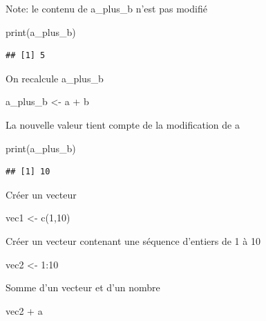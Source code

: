 \documentclass[
]{book}
\newenvironment{Shaded}{\begin{snugshade}}{\end{snugshade}}
\newcommand{\DecValTok}[1]{\textcolor[rgb]{0.00,0.00,0.81}{#1}}
\newcommand{\FunctionTok}[1]{\textcolor[rgb]{0.00,0.00,0.00}{#1}}
\newcommand{\NormalTok}[1]{#1}
\newcommand{\OtherTok}[1]{\textcolor[rgb]{0.56,0.35,0.01}{#1}}
\newcommand{\SpecialCharTok}[1]{\textcolor[rgb]{0.00,0.00,0.00}{#1}}
\begin{document}
Note: le contenu de a\_plus\_b n'est pas modifié

\begin{Shaded}
\begin{Highlighting}[]
\FunctionTok{print}\NormalTok{(a\_plus\_b) }
\end{Highlighting}
\end{Shaded}

\begin{verbatim}
## [1] 5
\end{verbatim}

On recalcule a\_plus\_b

\begin{Shaded}
\begin{Highlighting}[]
\NormalTok{a\_plus\_b }\OtherTok{\textless{}{-}}\NormalTok{ a }\SpecialCharTok{+}\NormalTok{ b }
\end{Highlighting}
\end{Shaded}

La nouvelle valeur tient compte de la modification de a

\begin{Shaded}
\begin{Highlighting}[]
\FunctionTok{print}\NormalTok{(a\_plus\_b)}
\end{Highlighting}
\end{Shaded}

\begin{verbatim}
## [1] 10
\end{verbatim}

Créer un vecteur

\begin{Shaded}
\begin{Highlighting}[]
\NormalTok{vec1 }\OtherTok{\textless{}{-}}  \FunctionTok{c}\NormalTok{(}\DecValTok{1}\NormalTok{,}\DecValTok{10}\NormalTok{)}
\end{Highlighting}
\end{Shaded}

Créer un vecteur contenant une séquence d'entiers de 1 à 10

\begin{Shaded}
\begin{Highlighting}[]
\NormalTok{vec2 }\OtherTok{\textless{}{-}}  \DecValTok{1}\SpecialCharTok{:}\DecValTok{10}
\end{Highlighting}
\end{Shaded}

Somme d'un vecteur et d'un nombre

\begin{Shaded}
\begin{Highlighting}[]
\NormalTok{vec2 }\SpecialCharTok{+}\NormalTok{ a }
\end{Highlighting}
\end{Shaded}
\end{document}
